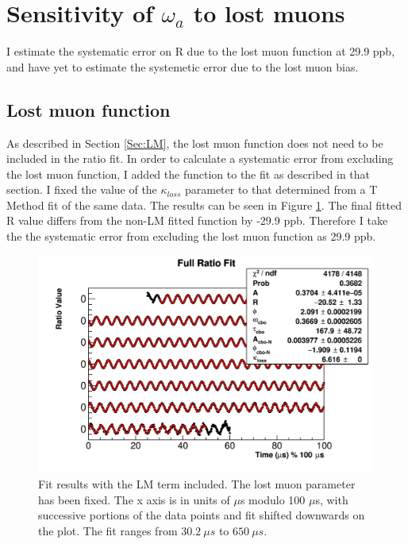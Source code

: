 \section{Sensitivity of \texorpdfstring{$\omega_{a}$}{} to lost muons}
\label{Sec:SystematicLM}

	I estimate the systematic error on R due to the lost muon function at 29.9 ppb, and have yet to estimate the systemetic error due to the lost muon bias.

	\subsection{Lost muon function}
	\label{SubSec:LMFunc}

		As described in Section \ref{Sec:LM}, the lost muon function does not need to be included in the ratio fit. In order to calculate a systematic error from excluding the lost muon function, I added the function to the fit as described in that section. I fixed the value of the $\kappa_{loss}$ parameter to that determined from a T Method fit of the same data. The results can be seen in Figure \ref{fig:LMModuloPlot}. The final fitted R value differs from the non-LM fitted function by -29.9 ppb. Therefore I take the the systematic error from excluding the lost muon function as 29.9 ppb.

		\begin{figure}[]
			\centering
			\includegraphics[width=\textwidth]{ratioCBO_moduloPlot-lostmuonsfixed}
		    \caption[LMModuloPlot]{Fit results with the LM term included. The lost muon parameter has been fixed. The x axis is in units of $\mu$s modulo 100 $\mu$s, with successive portions of the data points and fit shifted downwards on the plot. The fit ranges from $\SI{30.2}{\mu s}$ to $\SI{650}{\mu s}$.}
		    \label{fig:LMModuloPlot}
		\end{figure}


